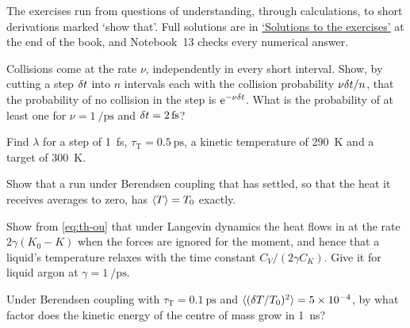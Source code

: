 \label{sec:th-exercises}

The exercises run from questions of understanding, through calculations,
to short derivations marked `show that'. Full solutions are in
\hyperref[sec:th-solutions]{`Solutions to the exercises'} at the end of
the book, and Notebook~13 checks every numerical answer.

\begin{exercise}
\label{ex:th-collisions}
Collisions come at the rate $\nu$, independently in every short interval.
Show, by cutting a step $\delta t$ into $n$ intervals each with the collision
probability $\nu\delta t/n$, that the probability of no collision in the step
is $\mathrm{e}^{-\nu\delta t}$. What is the probability of at least one for
$\nu = \SI{1}{\per\pico\second}$ and $\dt = \SI{2}{\femto\second}$?
\end{exercise}

\begin{exercise}
\label{ex:th-lambda}
Find $\lambda$ for a step of \SI{1}{\femto\second}, $\tau_{\mathrm T} =
\SI{0.5}{\pico\second}$, a kinetic temperature of \SI{290}{\kelvin} and a
target of \SI{300}{\kelvin}.
\end{exercise}

\begin{exercise}
\label{ex:th-mean}
Show that a run under Berendsen coupling that has settled, so that the
heat it receives averages to zero, has $\langle T \rangle = T_0$ exactly.
\end{exercise}

\begin{exercise}
\label{ex:th-langevin-tau}
Show from \cref{eq:th-ou} that under Langevin dynamics the heat flows in
at the rate $2\gamma(K_0 - K)$ when the forces are ignored for the moment,
and hence that a liquid's temperature relaxes with the time constant
$C_V/(2\gamma C_K)$. Give it for liquid argon at $\gamma =
\SI{1}{\per\pico\second}$.
\end{exercise}

\begin{exercise}
\label{ex:th-ice}
Under Berendsen coupling with $\tau_{\mathrm T} = \SI{0.1}{\pico\second}$
and $\langle (\delta T/T_0)^2 \rangle = \num{5e-4}$, by what factor does the kinetic energy of
the centre of mass grow in \SI{1}{\nano\second}?
\end{exercise}

